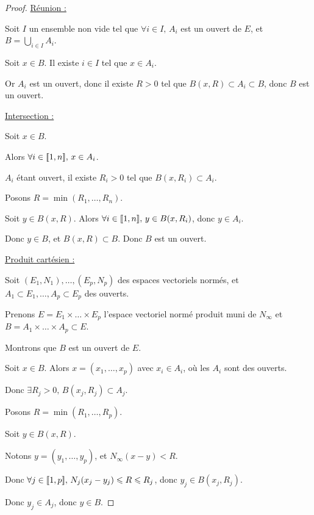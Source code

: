 \begin{proof}
    \uline{Réunion :}

    \svspace Soit $I$ un ensemble non vide tel que $\forall i \in I, \, A_i$ est un ouvert de $E$, et 
    $\displaystyle B = \bigcup_{i \in I} A_i$.

    Soit $x \in B$. Il existe $i \in I$ tel que $x \in A_i$.

    Or $A_i$ est un ouvert, donc il existe $R > 0$ tel que $B(x, R) \subset A_i \subset B$, 
    donc $B$ est un ouvert.

    \avspace \qquad \uline{Intersection : }

    \svspace Soit $x \in B$. 

    Alors $\forall i \in [\![1, n]\!], \, x \in A_i$. 

    $A_i$ étant ouvert, il existe $R_i > 0$ tel que $B(x, R_i) \subset A_i$.

    Posons $R = \min(R_1, \dots, R_n)$.

    Soit $y \in B(x, R)$. Alors $\forall i \in [\![1, n]\!], \, y \in B(x, R_i)$, donc $y \in A_i$.

    Donc $y \in B$, et $B(x, R) \subset B$. Donc $B$ est un ouvert.

    \avspace \qquad \uline{Produit cartésien : }

    \svspace Soit $(E_1, N_1), \dots, (E_p, N_p)$ des espaces vectoriels normés, et 
    $A_1 \subset E_1, \dots, A_p \subset E_p$ des ouverts.

    Prenons $E = E_1 \times \dots \times E_p$ l'espace vectoriel normé produit muni de $N_\infty$
    et $B = A_1 \times \dots \times A_p \subset E$.

    Montrons que $B$ est un ouvert de $E$.

    Soit $x \in B$. Alors $x = (x_1, \dots, x_p)$ avec $x_i \in A_i$, où les $A_i$ sont des ouverts.

    Donc $\exists R_j > 0, \, B(x_j, R_j) \subset A_j$.

    Posons $R = \min(R_1, \dots, R_p)$.

    Soit $y \in B(x, R)$. 

    Notons $y = (y_1, \dots, y_p)$, et $N_\infty(x - y) < R$.

    Donc $\forall j \in [\![1, p]\!], \, N_j(x_j - y_j) \leqslant R \leqslant R_j$, donc $y_j \in B(x_j, R_j)$.

    Donc $y_j \in A_j$, donc $y \in B$.

\end{proof}



